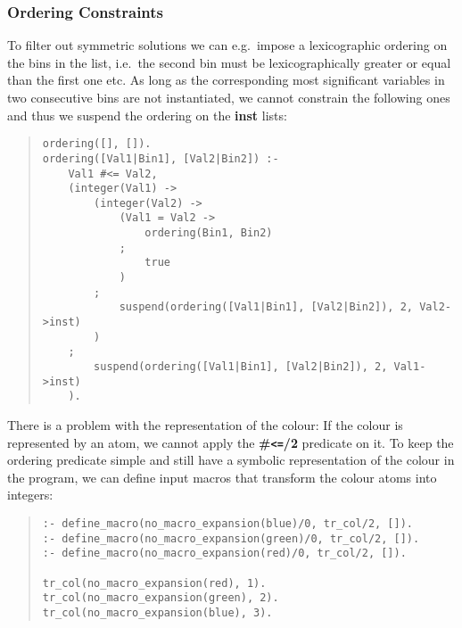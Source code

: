 \subsubsection{Ordering Constraints}
To filter out symmetric solutions we can e.g.\ impose a lexicographic
ordering on the bins in the list, i.e.\ the second bin must be
lexicographically greater or equal than the first one etc.
As long as the corresponding most significant
variables in two consecutive bins
are not instantiated, we cannot constrain the following ones
and thus we suspend the ordering on the {\bf inst} lists:

\begin{quote}
\begin{verbatim}
ordering([], []).
ordering([Val1|Bin1], [Val2|Bin2]) :-
    Val1 #<= Val2,
    (integer(Val1) ->
        (integer(Val2) ->
            (Val1 = Val2 ->
                ordering(Bin1, Bin2)
            ;
                true
            )
        ;
            suspend(ordering([Val1|Bin1], [Val2|Bin2]), 2, Val2->inst)
        )
    ;
        suspend(ordering([Val1|Bin1], [Val2|Bin2]), 2, Val1->inst)
    ).
\end{verbatim}
\end{quote}

There is a problem with the representation of the colour:
If the colour is represented by an atom, we cannot apply
the {\bf \#\verb+<=+/2} predicate on it.
To keep the ordering predicate simple and still have a symbolic
representation of the colour in the program, we can define
input macros that transform the colour atoms into integers:

\begin{quote}
\begin{verbatim}
:- define_macro(no_macro_expansion(blue)/0, tr_col/2, []).
:- define_macro(no_macro_expansion(green)/0, tr_col/2, []).
:- define_macro(no_macro_expansion(red)/0, tr_col/2, []).

tr_col(no_macro_expansion(red), 1).
tr_col(no_macro_expansion(green), 2).
tr_col(no_macro_expansion(blue), 3).
\end{verbatim}
\end{quote}

